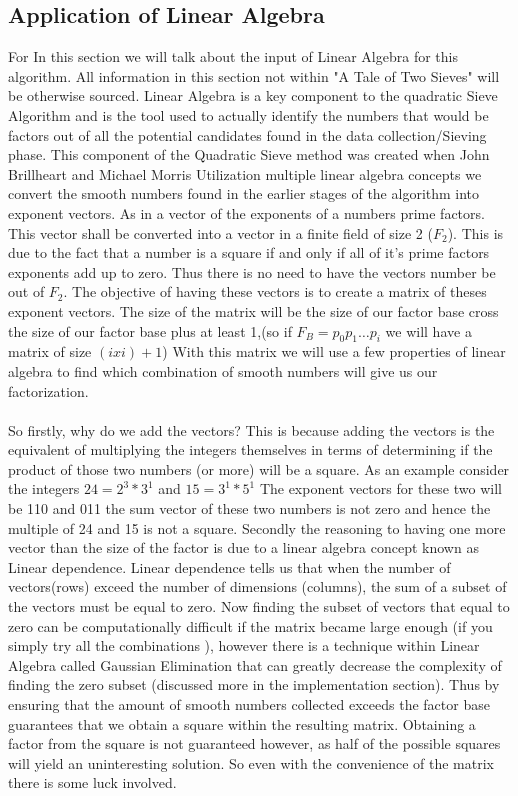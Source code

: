 \documentclass[12pt]{article} %
\begin{document}
	\subsection{Application of Linear Algebra}
	\indent For In this section we will talk about the input of Linear Algebra for this algorithm. All information in this section not within "A Tale of Two Sieves" will be otherwise sourced. Linear Algebra is a key component to the quadratic Sieve Algorithm and is the tool used to actually identify the numbers that would be factors out of all the potential candidates found in the data collection/Sieving phase. This component of the Quadratic Sieve method was created when John Brillheart and Michael Morris Utilization multiple linear algebra concepts we convert the smooth numbers found in the earlier stages of the algorithm into exponent vectors. As in a vector of the exponents of a numbers prime factors. This vector shall be converted into a vector in a finite field of size 2 ($F_2$). This is due to the fact that a number is a square if and only if all of it's prime factors exponents add up to zero. Thus there is no need to have the vectors number be out of $F_2$. The objective of having these vectors is to create a matrix of theses exponent vectors. The size of the matrix will be the size of our factor base cross the size of our factor base plus at least 1,(so if $F_B = p_0p_1\dots p_i$ we will have a matrix of size $(ixi)+1$) With this matrix we will use a few properties of linear algebra to find which combination of smooth numbers will give us our factorization. 
	\\\\
	\indent So firstly, why do we add the vectors? This is because adding the vectors is the equivalent of multiplying the integers themselves in terms of determining if the product of those two numbers (or more) will be a square. As an example consider the integers $24 = 2^{3}*3^{1}$ and $15 = 3^{1}*5^{1} $ The exponent vectors for these two will be 110 and 011 the sum vector of these two numbers is not zero and hence the multiple of 24 and 15 is not a square. Secondly the reasoning to having one more vector than the size of the factor is due to a linear algebra concept known as Linear dependence. Linear dependence tells us that when the number of vectors(rows) exceed the number of dimensions (columns), the sum of a subset of the vectors must be equal to zero. Now finding the subset of vectors that equal to zero can be computationally difficult if the matrix became large enough (if you simply try all the combinations ), however there is a technique within Linear Algebra called Gaussian Elimination that can greatly decrease the complexity of finding the zero subset (discussed more in the implementation section). Thus by ensuring that the amount of smooth numbers collected exceeds the factor base guarantees that we obtain a square within the resulting matrix. Obtaining a factor from the square is not guaranteed however, as half of the possible squares will yield an uninteresting solution. So even with the convenience of the matrix there is some luck involved.
	
\end{document}
